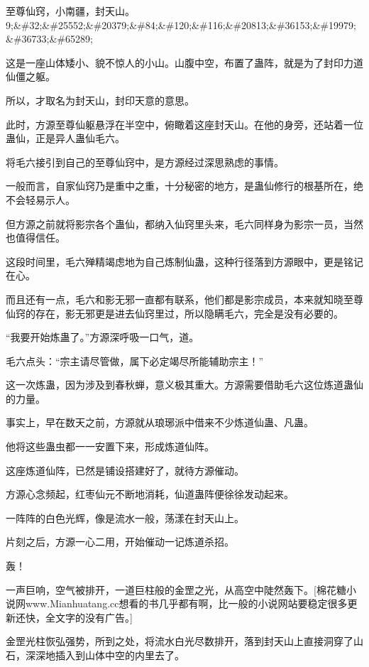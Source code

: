 
\begin{this_body}

至尊仙窍，小南疆，封天山。9;\&\#32;\&\#25552;\&\#20379;\&\#84;\&\#120;\&\#116;\&\#20813;\&\#36153;\&\#19979;\&\#36733;\&\#65289;

这是一座山体矮小、貌不惊人的小山。山腹中空，布置了蛊阵，就是为了封印力道仙僵之躯。

所以，才取名为封天山，封印天意的意思。

此时，方源至尊仙躯悬浮在半空中，俯瞰着这座封天山。在他的身旁，还站着一位蛊仙，正是异人蛊仙毛六。

将毛六接引到自己的至尊仙窍中，是方源经过深思熟虑的事情。

一般而言，自家仙窍乃是重中之重，十分秘密的地方，是蛊仙修行的根基所在，绝不会轻易示人。

但方源之前就将影宗各个蛊仙，都纳入仙窍里头来，毛六同样身为影宗一员，当然也值得信任。

这段时间里，毛六殚精竭虑地为自己炼制仙蛊，这种行径落到方源眼中，更是铭记在心。

而且还有一点，毛六和影无邪一直都有联系，他们都是影宗成员，本来就知晓至尊仙窍的存在，影无邪更是进去仙窍里过，所以隐瞒毛六，完全是没有必要的。

“我要开始炼蛊了。”方源深呼吸一口气，道。

毛六点头：“宗主请尽管做，属下必定竭尽所能辅助宗主！”

这一次炼蛊，因为涉及到春秋蝉，意义极其重大。方源需要借助毛六这位炼道蛊仙的力量。

事实上，早在数天之前，方源就从琅琊派中借来不少炼道仙蛊、凡蛊。

他将这些蛊虫都一一安置下来，形成炼道仙阵。

这座炼道仙阵，已然是铺设搭建好了，就待方源催动。

方源心念频起，红枣仙元不断地消耗，仙道蛊阵便徐徐发动起来。

一阵阵的白色光辉，像是流水一般，荡漾在封天山上。

片刻之后，方源一心二用，开始催动一记炼道杀招。

轰！

一声巨响，空气被排开，一道巨柱般的金罡之光，从高空中陡然轰下。[棉花糖小说网www.Mianhuatang.cc想看的书几乎都有啊，比一般的小说网站要稳定很多更新还快，全文字的没有广告。]

金罡光柱恢弘强势，所到之处，将流水白光尽数排开，落到封天山上直接洞穿了山石，深深地插入到山体中空的内里去了。


\end{this_body}
